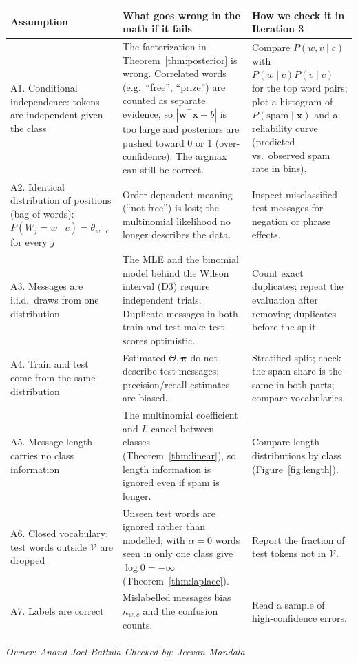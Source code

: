\documentclass[11pt]{article}
\newcommand{\owner}[2]{\par\noindent\textit{Owner: #1 \hfill Checked by: #2}\par\medskip}
\theoremstyle{plain}
\theoremstyle{definition}
\newcommand{\V}{\mathcal{V}}
\newcommand{\bx}{\mathbf{x}}
\newcommand{\bw}{\mathbf{w}}
\begin{document}
\begin{center}
\small
\begin{tabularx}{\textwidth}{@{}>{\raggedright\arraybackslash}p{3.3cm}
>{\raggedright\arraybackslash}X >{\raggedright\arraybackslash}X@{}}
\toprule
Assumption & What goes wrong in the math if it fails & How we check it in Iteration 3\\
\midrule
A1. Conditional independence: tokens are independent given the class &
The factorization in Theorem~\ref{thm:posterior} is wrong. Correlated words (e.g.\ ``free'',
``prize'') are counted as separate evidence, so $|\bw^\top\bx+b|$ is too large and posteriors
are pushed toward 0 or 1 (over-confidence). The argmax can still be correct. &
Compare $P(w,v\mid c)$ with $P(w\mid c)P(v\mid c)$ for the top word pairs; plot a histogram of
$P(\text{spam}\mid\bx)$ and a reliability curve (predicted vs.\ observed spam rate in bins).\\
\addlinespace
A2. Identical distribution of positions (bag of words): $P(W_j=w\mid c)=\theta_{w\mid c}$ for every $j$ &
Order-dependent meaning (``not free'') is lost; the multinomial likelihood no longer describes
the data. &
Inspect misclassified test messages for negation or phrase effects.\\
\addlinespace
A3. Messages are i.i.d.\ draws from one distribution &
The MLE and the binomial model behind the Wilson interval (D3) require independent
trials. Duplicate messages in both train and test make test scores optimistic. &
Count exact duplicates; repeat the evaluation after removing duplicates before the split.\\
\addlinespace
A4. Train and test come from the same distribution &
Estimated $\Theta,\boldsymbol\pi$ do not describe test messages; precision/recall estimates are
biased. &
Stratified split; check the spam share is the same in both parts; compare vocabularies.\\
\addlinespace
A5. Message length carries no class information &
The multinomial coefficient and $L$ cancel between classes (Theorem~\ref{thm:linear}), so
length information is ignored even if spam is longer. &
Compare length distributions by class (Figure~\ref{fig:length}).\\
\addlinespace
A6. Closed vocabulary: test words outside $\V$ are dropped &
Unseen test words are ignored rather than modelled; with $\alpha=0$ words seen in only one class
give $\log 0=-\infty$ (Theorem~\ref{thm:laplace}). &
Report the fraction of test tokens not in $\V$.\\
\addlinespace
A7. Labels are correct &
Mislabelled messages bias $n_{w,c}$ and the confusion counts. &
Read a sample of high-confidence errors.\\
\bottomrule
\end{tabularx}
\end{center}
\owner{Anand Joel Battula}{Jeevan Mandala}
\end{document}

